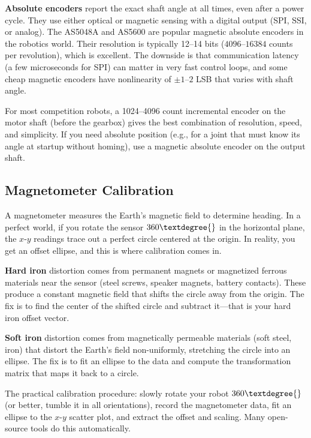 \textbf{Absolute encoders} report the exact shaft angle at all times, even after a power cycle. They use either optical or magnetic sensing with a digital output (SPI, SSI, or analog). The AS5048A and AS5600 are popular magnetic absolute encoders in the robotics world. Their resolution is typically 12--14 bits ($4096$--$16384$ counts per revolution), which is excellent. The downside is that communication latency (a few microseconds for SPI) can matter in very fast control loops, and some cheap magnetic encoders have nonlinearity of $\pm 1$--$2$ LSB that varies with shaft angle.

For most competition robots, a 1024--4096 count incremental encoder on the motor shaft (before the gearbox) gives the best combination of resolution, speed, and simplicity. If you need absolute position (e.g., for a joint that must know its angle at startup without homing), use a magnetic absolute encoder on the output shaft.

\subsection{Magnetometer Calibration}

A magnetometer measures the Earth's magnetic field to determine heading. In a perfect world, if you rotate the sensor $360\textdegree{}$ in the horizontal plane, the $x$-$y$ readings trace out a perfect circle centered at the origin. In reality, you get an offset ellipse, and this is where calibration comes in.

\textbf{Hard iron} distortion comes from permanent magnets or magnetized ferrous materials near the sensor (steel screws, speaker magnets, battery contacts). These produce a constant magnetic field that shifts the circle away from the origin. The fix is to find the center of the shifted circle and subtract it---that is your hard iron offset vector.

\textbf{Soft iron} distortion comes from magnetically permeable materials (soft steel, iron) that distort the Earth's field non-uniformly, stretching the circle into an ellipse. The fix is to fit an ellipse to the data and compute the transformation matrix that maps it back to a circle.

The practical calibration procedure: slowly rotate your robot $360\textdegree{}$ (or better, tumble it in all orientations), record the magnetometer data, fit an ellipse to the $x$-$y$ scatter plot, and extract the offset and scaling. Many open-source tools do this automatically.

